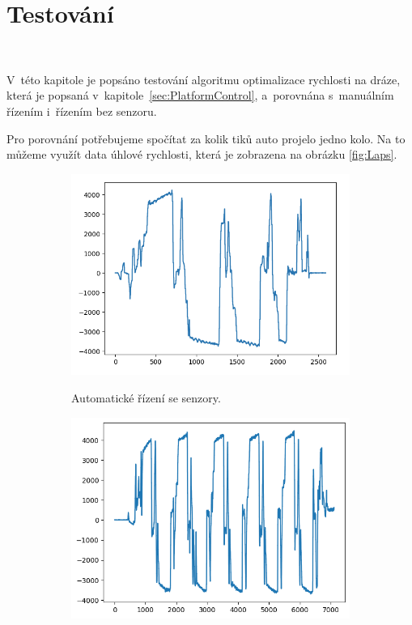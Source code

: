 \chapter{Testování}
\label{sec:Testing}
\

V~této kapitole je popsáno testování algoritmu optimalizace rychlosti na dráze,
která je popsaná v~kapitole~\ref{sec:PlatformControl}, a~porovnána s~manuálním
řízením i~řízením bez senzoru.

Pro porovnání potřebujeme spočítat za kolik tiků auto projelo jedno kolo. Na to můžeme využít data
úhlové rychlosti, která je zobrazena na obrázku \ref{fig:Laps}.

\begin{figure}[!h]
    \begin{subfigure}{.5\textwidth}
        \includegraphics[width = \textwidth]{Figures/LapAuto.png}
        \label{fig:LapsAuto}
        \caption{Automatické řízení se senzory.}
    \end{subfigure}
    \begin{subfigure}{.5\textwidth}
        \includegraphics[width = \textwidth]{Figures/LapAutoNoSensors.png}

\end{subfigure}
\end{figure}
